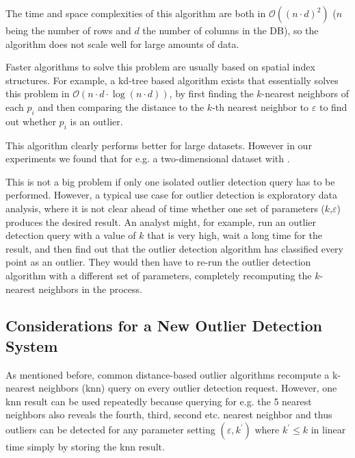 \documentclass[runningheads]{llncs}
\begin{document}
The time and space complexities of this algorithm are both in $\mathcal{O}((n\cdot d)^2)$ ($n$ being the number of rows and $d$ the number of columns in the DB), so the algorithm does not scale well for large amounts of data.

Faster algorithms to solve this problem are usually based on spatial index structures. For example, a kd-tree based algorithm exists that essentially solves this problem in $\mathcal{O}(n\cdot d \cdot\log(n\cdot d))$, by first finding the $k$-nearest neighbors of each $p_i$ and then comparing the distance to the $k$-th nearest neighbor to $\varepsilon$ to find out whether $p_i$ is an outlier. 

This algorithm clearly performs better for large datasets. However in our experiments we found that for e.g. a two-dimensional dataset with . %

This is not a big problem if only one isolated outlier detection query has to be performed. However, a typical use case for outlier detection is exploratory data analysis, where it is not clear ahead of time whether one set of parameters ($k$,$\varepsilon$) produces the desired result. An analyst might, for example, run an outlier detection query with a value of $k$ that is very high, wait a long time for the result, and then find out that the outlier detection algorithm has classified every point as an outlier. They would then have to re-run the outlier detection algorithm with a different set of parameters, completely recomputing the $k$-nearest neighbors in the process.
\subsection{Considerations for a New Outlier Detection System}
As mentioned before, common distance-based outlier algorithms recompute a k-nearest neighbors (knn) query on every outlier detection request. However, one knn result can be used repeatedly because querying for e.g. the 5 nearest neighbors also reveals the fourth, third, second etc. nearest neighbor and thus outliers can be detected for any parameter setting $(\varepsilon,k^\prime)$ where $k^\prime \leq k$ in linear time simply by storing the knn result.
\end{document}
